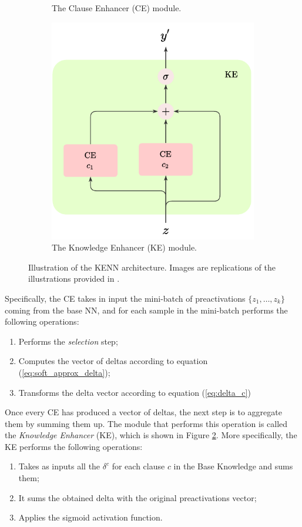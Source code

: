 \begin{figure}
\begin{subfigure}{.5\textwidth}
		\caption{The Clause Enhancer (CE) module.}
		\label{fig:ce}
	\end{subfigure}%
	\begin{subfigure}{.5\textwidth}
		\centering
		\includegraphics[width=0.9\linewidth]{figures/KE.pdf}
		\caption{The Knowledge Enhancer (KE) module.}
		\label{fig:ke}	
	\end{subfigure}
	\caption{Illustration of the KENN architecture. Images are replications of the illustrations provided in \cite{daniele2019kenn}.}
	\label{fig:kenn_architecture_unary}
\end{figure}
Specifically, the CE takes in input the mini-batch of preactivations $\{z_1,\dots,z_k\}$ coming from the base NN, and for each sample in the mini-batch performs the following operations:
\begin{enumerate}
	\item Performs the \textit{selection} step;
	\item Computes the vector of deltas according to equation (\ref{eq:soft_approx_delta});
	\item Transforms the delta vector according to equation (\ref{eq:delta_c})
\end{enumerate}
Once every CE has produced a vector of deltas, the next step is to aggregate them by summing them up. The module that performs this operation is called the \textit{Knowledge Enhancer} (KE), which is shown in Figure \ref{fig:ke}. More specifically, the KE performs the following operations:
\begin{enumerate}
	\item Takes as inputs all the $\delta^c$ for each clause $c$ in the Base Knowledge and sums them;
	\item It sums the obtained delta with the original preactivations vector;
	\item Applies the sigmoid activation function.
\end{enumerate}



